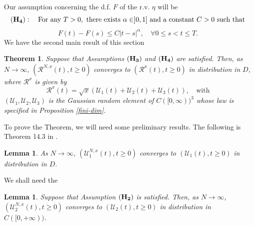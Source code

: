 \documentclass[11pt]{article}
\def\E{{\mathbb E}}
\def\R{{\mathbb R}}
\newtheorem{lemma}[theorem]{Lemma}
\newtheorem{theor}[theorem]{Theorem}
\begin{document}
Our assumption concerning the d.f. $F$ of the r.v. $\eta$ will be 
\begin{equation*}
{(\bf H_4)}  :  \quad \mbox{For any}\ T>0, \ \mbox{there exists} \ \alpha \in ]0,1] \ \mbox{and a constant} \ C>0 \ \mbox{such that} 
\end{equation*} 
\[ F(t)-F(s) \le C |t-s|^{\alpha}, \quad \forall 0\le s<t\le T.\]
We have the second main result of this section
 \begin{theor}\label{TCL} Suppose that Assumptions ${(\bf H_3)}$ and ${(\bf H_4)}$ are satisfied. Then, as $N \rightarrow \infty$, 
$(\mathcal{R}^{N,x}(t), t\ge 0)$ converges to $(\mathcal{R}^{x}(t), t\ge 0)$ in distribution in $D$, where $\mathcal{R}^{x}$ is given by
\begin{equation*}
 \mathcal{R}^{x}(t)=\sqrt{x} \left( \mathcal{U}_1(t)+\mathcal{U}_2(t)+\mathcal{U}_3(t) \right), \quad \mbox{with}
\end{equation*}
$(\mathcal{U}_1, \mathcal{U}_2, \mathcal{U}_3)$ is the Gaussian random element of $C([0,\infty))^3$ whose law is specified in Proposition \ref{fini-dim}. 
%
 \end{theor}
To prove the Theorem, we will need some preliminary results. The following is Theorem 14.3 in \cite{Bill}.
\begin{lemma}\label{lemtigU1N}
As $N \rightarrow \infty$, 
$(\mathcal{U}_1^{N,x}(t), t\ge 0)$ converges to $(\mathcal{U}_1(t), t\ge 0)$ in distribution in $D$.
\end{lemma}
We shall need the 
\begin{lemma}\label{lemtigU2N}
Suppose that Assumption ${(\bf H_2)}$ is satisfied. Then, as $N \rightarrow \infty$, $(\mathcal{U}_2^{N,x}(t), t\ge 0)$ converges to $(\mathcal{U}_2(t), t\ge 0)$ in distribution in $C([0,+\infty))$.
\end{lemma}
\end{document}
